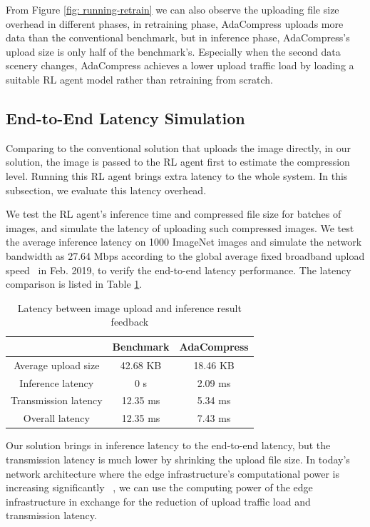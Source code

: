 From Figure \ref{fig: running-retrain} we can also observe the uploading file size overhead in different phases, in retraining phase, AdaCompress uploads more data than the conventional benchmark, but in inference phase, AdaCompress's upload size is only half of the benchmark's. Especially when the second data scenery changes, AdaCompress achieves a lower upload traffic load by loading a suitable RL agent model rather than retraining from scratch. %

\subsection{End-to-End Latency Simulation}

Comparing to the conventional solution that uploads the image directly, in our solution, the image is passed to the RL agent first to estimate the compression level. Running this RL agent brings extra latency to the whole system. In this subsection, we evaluate this latency overhead. %

We test the RL agent's inference time and compressed file size for batches of images, and simulate the latency of uploading such compressed images. We test the average inference latency on 1000 ImageNet images and simulate the network bandwidth as 27.64 Mbps according to the global average fixed broadband upload speed~\cite{speedtest} in Feb. 2019, to verify the end-to-end latency performance. The latency comparison is listed in Table \ref{tab: latency-overhead}. %

\begin{table}[htbp]
    \centering
    \begin{tabular}{ccc}
        \toprule
        & Benchmark & AdaCompress  \\ \midrule
        Average upload size          & 42.68 KB  &  18.46 KB            \\
        Inference latency    & 0 s       & 2.09 ms          \\
        Transmission latency & 12.35 ms       & 5.34 ms          \\
        Overall latency      & 12.35 ms       & 7.43 ms          \\ \bottomrule
    \end{tabular}
    \caption{Latency between image upload and inference result feedback}
    \label{tab: latency-overhead}
\end{table}

Our solution brings in inference latency to the end-to-end latency, but the transmission latency is much lower by shrinking the upload file size. In today's network architecture where the edge infrastructure's computational power is increasing significantly ~\cite{satyanarayanan2017emergence,hu2015mobile}, we can use the computing power of the edge infrastructure in exchange for the reduction of upload traffic load and transmission latency. %

